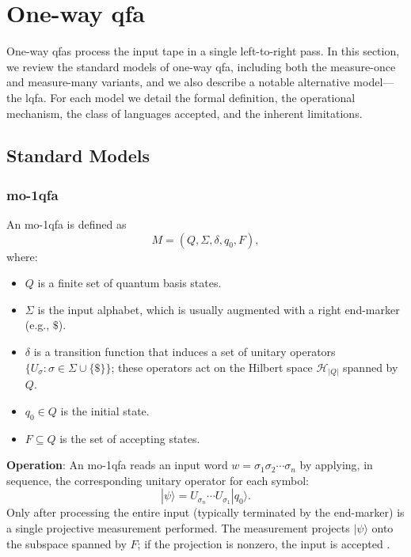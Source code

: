 
\section{One-way \gls{qfa}}
\label{sec:one-way-qfas}

One-way \glspl{qfa} process the input tape in a single left-to-right pass. In this section, we review the standard models of one-way \gls{qfa}, including both the measure-once and measure-many variants, and we also describe a notable alternative model—the \gls{lqfa}. For each model we detail the formal definition, the operational mechanism, the class of languages accepted, and the inherent limitations.

\subsection{Standard Models}
\label{subsec:standard-models}

\subsubsection{\acrfull{mo-1qfa}}
\label{sssec:mo-1qfa}
\begin{definition}
An \gls{mo-1qfa} is defined as 
\[
M = (Q, \Sigma, \delta, q_0, F),
\]
where:
\begin{itemize}
    \item \( Q \) is a finite set of quantum basis states.
    \item \( \Sigma \) is the input alphabet, which is usually augmented with a right end-marker (e.g., \( \$ \)).
    \item \( \delta \) is a transition function that induces a set of unitary operators \( \{ U_\sigma : \sigma \in \Sigma \cup \{\$\} \} \); these operators act on the Hilbert space \( \mathcal{H}_{|Q|} \) spanned by \( Q \).
    \item \( q_0 \in Q \) is the initial state.
    \item \( F \subseteq Q \) is the set of accepting states.
\end{itemize}
\end{definition}

\textbf{Operation}:  
An \gls{mo-1qfa} reads an input word \( w = \sigma_1\sigma_2\cdots\sigma_n \) by applying, in sequence, the corresponding unitary operator for each symbol:
\[
|\psi\rangle = U_{\sigma_n} \cdots U_{\sigma_1} |q_0\rangle.
\]
Only after processing the entire input (typically terminated by the end-marker) is a single projective measurement performed. The measurement projects \( |\psi\rangle \) onto the subspace spanned by \( F \); if the projection is nonzero, the input is accepted \cite{moore2000quantum,bertoni2001regular}.

